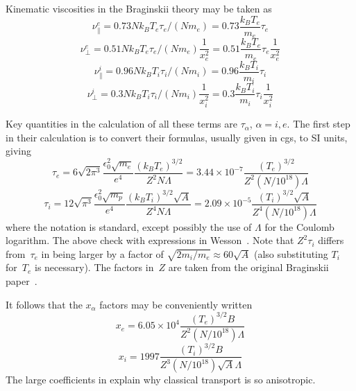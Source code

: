 Kinematic viscosities in the Braginskii theory may be taken as
\begin{equation}\label{eq:nuparae}
\nu^e_{\|}= 0.73 Nk_BT_e \tau_e /(N m_e) = 0.73 \frac{k_BT_e}{m_e} \tau_e
\end{equation}
\begin{equation}\label{eq:nuperpe}
\nu^e_{\perp}= 0.51 Nk_BT_e \tau_e /(N m_e) \frac{1}{x_e^2}= 0.51 \frac{k_BT_e}{m_e} \tau_e\frac{1}{x_e^2}
\end{equation}
\begin{equation}\label{eq:nuparai}
\nu^i_{\|}= 0.96 Nk_BT_i \tau_i /(N m_i) = 0.96 \frac{k_BT_i}{m_i} \tau_i
\end{equation}
\begin{equation}\label{eq:nuperpi}
\nu^i_{\perp}= 0.3 Nk_BT_i \tau_i  /(N m_i)\frac{1}{x_i^2} = 0.3 \frac{k_BT_i}{m_i} \tau_i\frac{1}{x_i^2}
\end{equation}


Key quantities in the calculation of all these terms are $\tau_\alpha$, $\alpha=i,e$.
The first step in their calculation is to convert their formulas,
usually given in cgs, to SI units, giving
\begin{equation}\label{eq:tauesi}
\tau_e=6 \sqrt{2\pi^3} \frac{\epsilon_0^2\sqrt{m_e}}{e^4} \frac{(k_BT_e)^{3/2}}{Z^2 N \Lambda}
=3.44 \times 10^{-7} \frac{(T_e)^{3/2}}{Z^2 (N/10^{18}) \Lambda}
\end{equation}
\begin{equation}\label{eq:tauisi}
\tau_i=12 \sqrt{\pi^3} \frac{\epsilon_0^2\sqrt{m_p}}{e^4} \frac{(k_BT_i)^{3/2} \sqrt{A}}{Z^4 N \Lambda}
=2.09 \times 10^{-5} \frac{(T_i)^{3/2} \sqrt{A}}{Z^4 (N/10^{18}) \Lambda}
\end{equation}
where the notation is standard, except possibly the use of $\Lambda$ for
the Coulomb logarithm. The above check with expressions in Wesson~\cite[\S\,14]{wesson}.
Note that $Z^2 \tau_i$ differs from~$\tau_e$ in being larger by  a factor of $\sqrt{2m_i/m_e}\approx 60 \sqrt{A}$
(also substituting $T_i$ for~$T_e$ is necessary). The factors in~$Z$ are taken from the
original Braginskii paper~\cite{Br65Tranwarv}.

It follows that the $x_\alpha$ factors may be conveniently written
\begin{equation}\label{eq:xen}
x_e =6.05 \times 10^{4} \frac{(T_e)^{3/2} B}{Z^2 (N/10^{18}) \Lambda}
\end{equation}
\begin{equation}\label{eq:xin}
x_i =1997 \frac{(T_i)^{3/2} B}{Z^3 (N/10^{18}) \sqrt{A} \Lambda}
\end{equation}
The large coefficients in  explain why classical transport is
so anisotropic.

